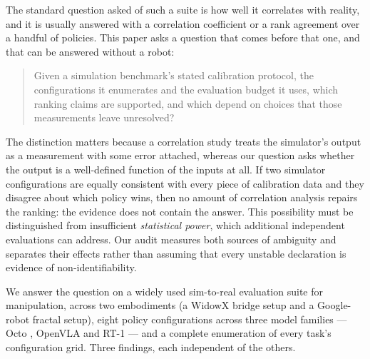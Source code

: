 \documentclass[pdflatex,iicol,sn-apa]{sn-jnl}
\theoremstyle{remark}
\begin{document}
The standard question asked of such a suite is how well it correlates with reality, and it is
usually answered with a correlation coefficient or a rank agreement over a handful of policies.
This paper asks a question that comes before that one, and that can be answered without a robot:

\begin{quote}
Given a simulation benchmark's stated calibration protocol, the configurations it enumerates and
the evaluation budget it uses, which ranking claims are supported, and which depend on choices
that those measurements leave unresolved?
\end{quote}

The distinction matters because a correlation study treats the simulator's output as a measurement
with some error attached, whereas our question asks whether the output is a well-defined function
of the inputs at all. If two simulator configurations are equally consistent with every piece of
calibration data and they disagree about which policy wins, then no amount of correlation analysis
repairs the ranking: the evidence does not contain the answer. This possibility must be distinguished
from insufficient \emph{statistical power}, which additional independent evaluations can address.
Our audit measures both sources of ambiguity and separates their effects rather than assuming
that every unstable declaration is evidence of non-identifiability.

We answer the question on a widely used sim-to-real evaluation suite for manipulation, across two
embodiments (a WidowX bridge setup and a Google-robot fractal setup), eight policy configurations
across three model families --- Octo \citep{octo2024}, OpenVLA \citep{kim2024openvla} and RT-1
\citep{brohan2023rt1} --- and a complete enumeration of every task's configuration grid. Three
findings, each independent of the others.
\end{document}
